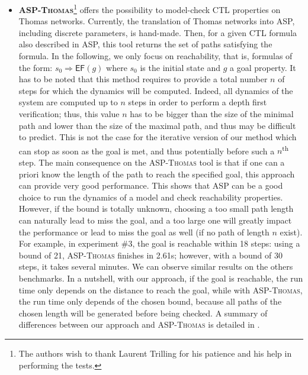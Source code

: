 \begin{itemize}[leftmargin=*]
\item \textbf{\textsc{ASP-Thomas}}\footnote{The authors wish to thank Laurent Trilling for his patience and his help in performing the tests.}
offers the possibility to model-check CTL properties on Thomas networks.
Currently, the translation of Thomas networks into ASP, including discrete parameters, is hand-made.
Then, for a given CTL formula also described in ASP, this tool returns the set of paths satisfying the formula.
In the following, we only focus on reachability, that is, formulas of the form: $s_0 \Rightarrow \mathsf{EF}(g)$
where $s_0$ is the initial state and $g$ a goal property.
It has to be noted that this method requires to provide a total number $n$ of steps
for which the dynamics will be computed.
Indeed, all dynamics of the system are computed up to $n$ steps in order to perform a depth first verification;
thus, this value $n$ has to be bigger than the size of the minimal path and lower than the size of the maximal path,
and thus may be difficult to predict.
This is not the case for the iterative version of our method which can stop as soon as the goal is met,
and thus potentially before such a $n$\textsuperscript{th} step.
The main consequence on the \textsc{ASP-Thomas} tool
is that if one can a priori know the length of the path to reach the specified goal,
this approach can provide very good performance.
This shows that ASP can be a good choice to run the dynamics of a model and check reachability properties.
However, if the bound is totally unknown, choosing a too small path length can naturally lead to miss the goal,
and a too large one will greatly impact the performance or lead to miss the goal as well (if no path of length $n$ exist).
For example, in experiment \#3, the goal is reachable within 18 steps:
using a bound of 21, \textsc{ASP-Thomas} finishes in 2.61s;
however, with a bound of 30 steps, it takes several minutes.
We can observe similar results on the others benchmarks.
In a nutshell, with our approach, if the goal is reachable, the run time only depends on the distance to reach the goal,
while with \textsc{ASP-Thomas}, the run time only depends of the chosen bound,
because all paths of the chosen length will be generated before being checked.
A summary of differences between our approach and \textsc{ASP-Thomas} is detailed in .

\end{itemize}
